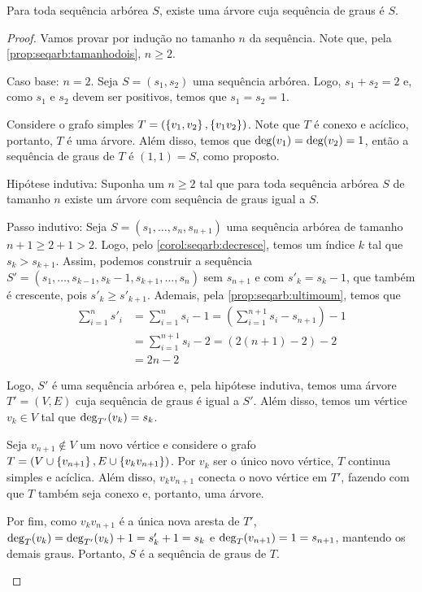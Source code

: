\begin{lemma} \label{lemma:seqarb:existearvore}
    Para toda sequência arbórea $S$, existe uma árvore cuja sequência de graus é $S$.
\end{lemma}

\enlargethispage{1em}
\begin{proof}
    Vamos provar por indução no tamanho $n$ da sequência. Note que, pela \cref{prop:seqarb:tamanhodois}, $n \geq 2$.

    \begin{ncasos}
        \item[Caso base:] $n = 2$. Seja $S = (s_1, s_2)$ uma sequência arbórea. Logo, $s_1 + s_2 = 2$ e, como $s_1$ e $s_2$ devem ser positivos, temos que $s_1 = s_2 = 1$.

        Considere o grafo simples $T = (\set{v_1, v_2}, \set{v_1 v_2})$. Note que $T$ é conexo e acíclico, portanto, $T$ é uma árvore. Além disso, temos que $\operatorname{deg}(v_1) = \operatorname{deg}(v_2) = 1$, então a sequência de graus de $T$ é $(1, 1) = S$, como proposto.

        \item[Hipótese indutiva:] Suponha um $n \geq 2$ tal que para toda  sequência arbórea $S$ de tamanho $n$ existe um árvore com sequência de graus igual a $S$.

        \item[Passo indutivo:] Seja $S = (s_1, \ldots, s_n, s_{n+1})$ uma sequência arbórea de tamanho $n + 1 \geq 2 + 1 > 2$. Logo, pelo \cref{corol:seqarb:decresce}, temos um índice $k$ tal que $s_k > s_{k + 1}$. Assim, podemos construir a sequência $S' = (s_1, \ldots, s_{k - 1}, s_k - 1, s_{k + 1}, \ldots, s_n)$ sem $s_{n + 1}$ e com $s'_k = s_k - 1$, que também é crescente, pois $s'_k \geq s'_{k + 1}$. Ademais, pela \cref{prop:seqarb:ultimoum}, temos que
        \begin{align*}
            \sum_{i = 1}^n s'_i &= \sum_{i = 1}^n s_i - 1 = \left(\sum_{i = 1}^{n + 1} s_i - s_{n + 1}\right) - 1 \\
                &= \sum_{i = 1}^{n + 1} s_i - 2 = \left(2 (n + 1) - 2\right) - 2 \\
                &= 2n - 2
        \end{align*}

        Logo, $S'$ é uma sequência arbórea e, pela hipótese indutiva, temos uma árvore $T' = (V, E)$ cuja sequência de graus é igual a $S'$. Além disso, temos um vértice $v_k \in V$ tal que $\operatorname{deg}_{T'}(v_k) = s_k$.

        Seja $v_{n + 1} \not\in V$ um novo vértice e considere o grafo $T = (V \cup \set{v_{n + 1}}, E \cup \set{v_k v_{n + 1}})$. Por $v_k$ ser o único novo vértice, $T$ continua simples e acíclica. Além disso, $v_k v_{n + 1}$ conecta o novo vértice em $T'$, fazendo com que $T$ também seja conexo e, portanto, uma árvore.

        Por fim, como $v_k v_{n + 1}$ é a única nova aresta de $T'$,  $\operatorname{deg}_T(v_k) = \operatorname{deg}_{T'}(v_k) + 1 = s'_k + 1 = s_k$ e $\operatorname{deg}_T(v_{n + 1}) = 1 = s_{n + 1}$, mantendo os demais graus. Portanto, $S$ é a sequência de graus de $T$. \qedhere
    \end{ncasos}
\end{proof}

